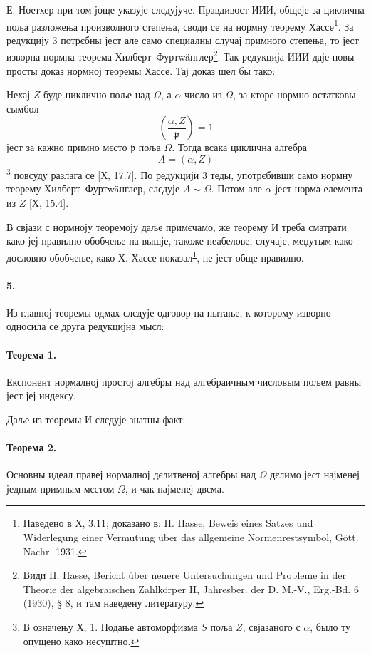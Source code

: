\documentclass[11pt]{article}
\newcommand{\foreign}[1]{#1}
\begin{document}
Е. Ноетхер при том јоще указује слєдујуче.
Правдивост ИИИ, общеје за циклична поља разложења произволного степења, своди се на нормну теорему Хассе\footnote{\label{fn:p38-hasse-normensatz}Наведено в Х, 3.11; доказано в: \foreign{H. Hasse, Beweis eines Satzes und Widerlegung einer Vermutung über das allgemeine Normenrestsymbol, Gött. Nachr. 1931}.}. За редукцију 3 потрєбны јест але само специалны случај примного степења, то јест изворна нормна теорема Хилберт--Фуртwäнглер\footnote{Види \foreign{H. Hasse, Bericht über neuere Untersuchungen und Probleme in der Theorie der algebraischen Zahlkörper II, Jahresber. der D. M.-V., Erg.-Bd. 6 (1930), § 8}, и там наведену литературу.}. Так редукција ИИИ даје новы просты доказ нормној теоремы Хассе. Тај доказ шел бы тако:

Нехај \(Z\) буде циклично поље над \(\Omega\), а \(\alpha\) число из \(\Omega\), за кторе нормно-остатковы сымбол
\[
\left(\frac{\alpha,Z}{\mathfrak p}\right)=1
\]
јест за кажно примно мєсто \(\mathfrak p\) поља \(\Omega\). Тогда всака циклична алгебра
\[
A=(\alpha,Z)
\]
\footnote{В означењу Х, 1. Подање автоморфизма \(S\) поља \(Z\), свјазаного с \(\alpha\), было ту опущено како несуштно.} повсуду разлага се [Х, 17.7]. По редукцији 3 теды, употрєбивши само нормну теорему Хилберт--Фуртwäнглер, слєдује \(A\sim\Omega\). Потом але \(\alpha\) јест норма елемента из \(Z\) [Х, 15.4].

В свјази с нормноју теоремоју даље примєчамо, же теорему И треба сматрати како јеј правилно обобчење на вышје, такоже неабелове, случаје, меџутым како дословно обобчење, како Х. Хассе показал\textsuperscript{\ref{fn:p38-hasse-normensatz}}, не јест обще правилно.

\paragraph{5.}
Из главној теоремы одмах слєдује одговор на пытање, к которому изворно односила се друга редукцијна мысл:

\paragraph{Теорема 1.}
Експонент нормалној простој алгебры над алгебраичным числовым пољем равны јест јеј индексу.

Даље из теоремы И слєдује знатны факт:

\paragraph{Теорема 2.}
Основны идеал правеј нормалној дєлитвеној алгебры над \(\Omega\) дєлимо јест најменеј једным примным мєстом \(\Omega\), и чак најменеј двєма.
\end{document}
